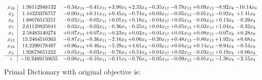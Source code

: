 \documentclass[9pt]{article}
\begin{document}
\[\begin{array}{c| c c@{\hskip 2pt} c@{\hskip 2pt} c@{\hskip 2pt} c@{\hskip 2pt} c@{\hskip 2pt} c@{\hskip 2pt} c@{\hskip 2pt} c@{\hskip 2pt} c@{\hskip 2pt} }
 x_{10}   &  1.98112948132 & -0.34 x_{14} & -0.41 x_{11} & +  3.90 x_{3} & +  2.33 x_{4} & -0.35 x_{17} & -0.78 x_{12} & +  0.09 x_{13} & -8.92 x_{8} & -10.14 x_{9}\\
 x_{2}   &  1.44323376757 & -0.00 x_{14} & +  0.11 x_{11} & +  0.45 x_{3} & -0.74 x_{4} & +  0.03 x_{17} & -0.05 x_{12} & -0.01 x_{13} & -0.92 x_{8} & +  1.41 x_{9}\\
 x_{6}   &  1.68076513251 & -0.02 x_{14} & -0.02 x_{11} & +  0.01 x_{3} & +  0.18 x_{4} & -0.04 x_{17} & +  0.05 x_{12} & -0.04 x_{13} & +  0.13 x_{8} & -0.29 x_{9}\\
 x_{7}   &  2.61129825044 & -0.02 x_{14} & -0.02 x_{11} & -0.36 x_{3} & -0.25 x_{4} & +  0.04 x_{17} & +  0.05 x_{12} & +  0.02 x_{13} & +  1.04 x_{8} & -0.32 x_{9}\\
 x_{1}   &  2.58483140274 & +  0.07 x_{14} & +  0.07 x_{11} & -0.23 x_{3} & +  0.02 x_{4} & -0.01 x_{17} & +  0.01 x_{12} & +  0.08 x_{13} & -0.07 x_{8} & +  0.28 x_{9}\\
 x_{15}   &  13.2464510363 & -0.87 x_{14} & -0.36 x_{11} & -2.16 x_{3} & +  0.06 x_{4} & -0.20 x_{17} & +  0.48 x_{12} & -0.80 x_{13} & +  1.92 x_{8} & +  0.68 x_{9}\\
 x_{16}   &  14.2299178497 & +  0.96 x_{14} & +  0.46 x_{11} & -5.29 x_{3} & +  4.61 x_{4} & -0.03 x_{17} & +  0.04 x_{12} & +  0.14 x_{13} & -9.94 x_{8} & -0.54 x_{9}\\
 x_{5}   &  1.92678651222 & +  0.05 x_{14} & -0.03 x_{11} & -0.76 x_{3} & +  0.54 x_{4} & +  0.04 x_{17} & +  0.02 x_{12} & -0.03 x_{13} & +  0.19 x_{8} & +  0.06 x_{9}\\
\hline
z    &  -10.2469150655 & -0.08 x_{14} & -0.10 x_{11} & -0.11 x_{3} & -0.76 x_{4} & -0.05 x_{17} & -0.09 x_{12} & -0.01 x_{13} & -1.38 x_{8} & -2.15 x_{9}\\
\end{array}\]
Primal Dictionary with original objective is:
\end{document}

